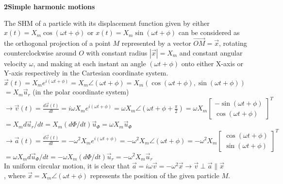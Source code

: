 \documentclass[a4paper,12pt,oneside]{report}
\newenvironment{tree}[4]{
\begin{list}{#1}{\parskip=0in \topsep=0in \itemsep=0in \parsep=0in \partopsep=0in \leftmargin=#2 \rightmargin=#3 \itemindent=#4 \listparindent=\itemindent}
}{\end{list}}
\newenvironment{ssection}[5]{
\phantom{#1}\textbf{#2\space#3}
\begin{tree}{#4}{0in}{0in}{#5}
}{\end{tree}}
\begin{document}
\begin{ssection}{\space}{2}{Simple harmonic motions}{\textbullet}{\parindent}
\item The SHM of a particle with its displacement function given by either $x(t)=X_{m}\cos(\omega t+\phi)$ or $x(t)=X_{m}\sin(\omega t+\phi)$ can be considered as the orthogonal projection of a point $M$ represented by a vector $\overrightarrow{OM}=\vec{x}$, rotating counterclockwise around $O$ with constant radius $|\vec{x}|=X_{m}$ and constant angular velocity $\omega$, and making at each instant an angle $(\omega t+\phi)$ onto either X-axis or Y-axis respectively in the Cartesian coordinate system.\\
\indent $\vec{x}(t)=X_{m}e^{i(\omega t+\phi)}=X_{m}\angle(\omega t+\phi)=X_{m}(\cos(\omega t+\phi),\sin(\omega t+\phi))$\\ \indent{}$=X_{m}\vec{u}_{r}$ (in the polar coordinate system)\\
\indent$\rightarrow \vec{v}(t)=\displaystyle\frac{d\vec{x}(t)}{dt}=i\omega X_{m}e^{i(\omega t+\phi)}=\omega X_{m}\angle(\omega t+\phi+\frac{\pi}{2})=\omega X_{m}\left[\begin{array}{c}-\sin(\omega t+\phi)\\\cos(\omega t+\phi)\end{array}\right]^{T}$\\ \indent{} $=X_{m}d\vec{u}_{r}/dt=X_{m}(d\Phi/dt)\vec{u}_{\Phi}=\omega X_{m}\vec{u}_{\Phi}$\\
\indent$\rightarrow \vec{a}(t)=\displaystyle\frac{d\vec{v}(t)}{dt}=-\omega^{2}X_{m}e^{i(\omega t+\phi)}=-\omega^{2}X_{m}\angle(\omega t+\phi)=-\omega^{2}X_{m}\left[\begin{array}{c}\cos(\omega t+\phi)\\\sin(\omega t+\phi)\end{array}\right]^{T}$\\ \indent{}
$=\omega X_{m}d\vec{u}_{\Phi}/dt=-\omega X_{m}(d\Phi/dt)\vec{u}_{r}=-\omega^{2}X_{m}\vec{u}_{r}$\\
\indent In uniform circular motion, it is clear that $\vec{a}=i\omega\vec{v}=-\omega^{2}\vec{x} \rightarrow \vec{v}\perp\vec{a}\parallel\vec{x}$\\, where $\vec{x}=X_{m}\angle(\omega t+\phi)$ represents the position of the given particle $M$.\\
\begin{tabular}{ccp{}}

\end{tabular}
\end{ssection}
\end{document}

